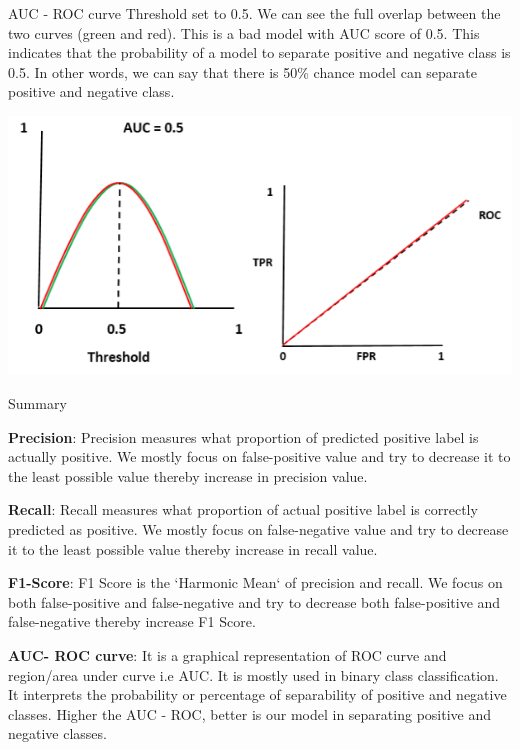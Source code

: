 \documentclass[11pt]{beamer}
\begin{document}
\begin{frame}{AUC - ROC curve}
	Threshold set to 0.5. We can see the full overlap between the two curves (green and red). This is a bad model with AUC score of 0.5. This indicates that the probability of a model to separate positive and negative class is 0.5. In other words, we can say that there is 50\% chance model can separate positive and negative class.
	\begin{center}
	\includegraphics[scale=0.5]{../05-pictures/lesson-4-1_pic_6.png}
	\end{center}
\end{frame}
\begin{frame}{Summary}
	\begin{itemize}
		\item \footnotesize{\textbf{Precision}: Precision measures what proportion of predicted positive label is actually positive. We mostly focus on false-positive value and try to decrease it to the least possible value thereby increase in precision value.
		\item \textbf{Recall}: Recall measures what proportion of actual positive label is correctly predicted as positive. We mostly focus on false-negative value and try to decrease it to the least possible value thereby increase in recall value.
		\item \textbf{F1-Score}: F1 Score is the `Harmonic Mean` of precision and recall. We focus on both false-positive and false-negative and try to decrease both false-positive and false-negative thereby increase F1 Score.
		\item \textbf{AUC- ROC curve}: It is a graphical representation of ROC curve and region/area under curve i.e AUC. It is mostly used in binary class classification. It interprets the probability or percentage of separability of positive and negative classes. Higher the AUC - ROC, better is our model in separating positive and negative classes.}
	\end{itemize}
\end{frame}
%
\end{document}
